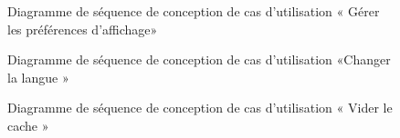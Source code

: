 \begin{figure}[H]
  \centering
  \caption{Diagramme de séquence de conception de cas d'utilisation « Gérer les préférences d'affichage»}
  \label{fig:conception_sequence_preferance_affichage}
\end{figure}

\begin{figure}[H]
  \centering
  \caption{Diagramme de séquence de conception de cas d'utilisation «Changer la langue »}
  \label{fig:conception_sequence_change_language}
\end{figure}

\begin{figure}[H]
  \centering
  \caption{Diagramme de séquence de conception de cas d'utilisation «  Vider le cache »}
  \label{fig:conception_sequence_clear_cache}
\end{figure}

